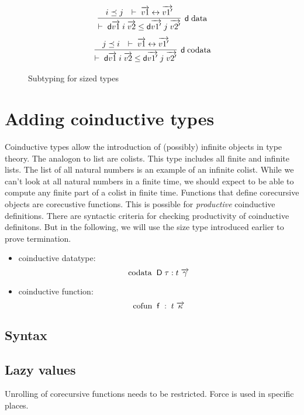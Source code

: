 \begin{figure}[p]
\[
\begin{array}{c}
	  \infer{\LeqVal{\dd \vec{v1} \; i \; \vec{v2}}{\dd \vec{v1'} \; j \; \vec{v2'}}}
	      {i \preceq j & \EqVal{\vec{v1}}{\vec{v1'}}}
\end{array}\dd \; \data
\]
\[
\begin{array}{c}
	  \infer{\LeqVal{\dd \vec{v1} \; i \; \vec{v2}}{\dd \vec{v1'} \; j \; \vec{v2'}}}
	      {j \preceq i & \EqVal{\vec{v1}}{\vec{v1'}}}
\end{array}
\dd \; \codata
\]
\caption{Subtyping for sized types}
\end{figure}

\chapter{Adding coinductive types}

Coinductive types allow the introduction of (possibly) infinite objects in type theory.
The analogon to list are colists. This type includes all finite and infinite lists.
The list of all natural numbers is an example of an infinite colist.
While we can't look at all natural numbers in a finite time, we should expect to be able to
compute any finite part of a colist in finite time.
Functions that define corecursive objects are corecustive functions.
This is possible for \emph{productive} coinductive definitions.
There are syntactic criteria for checking productivity of coinductive definitons.
But in the following, we will use the size type introduced earlier to prove termination.

\begin{itemize}
\item
coinductive datatype:
\[\mathrm{codata}\; \; \mathsf{D} \; \tau : t \; \overrightarrow{\gamma}\]  

\item
coinductive function:
\[\mathrm{cofun}\; \; \mathsf{f} \; : \; t \; \overrightarrow{\kappa}\]
\end{itemize}

\section{Syntax}

\section{Lazy values}
Unrolling of corecursive functions needs to be restricted.
Force is used in specific places.


